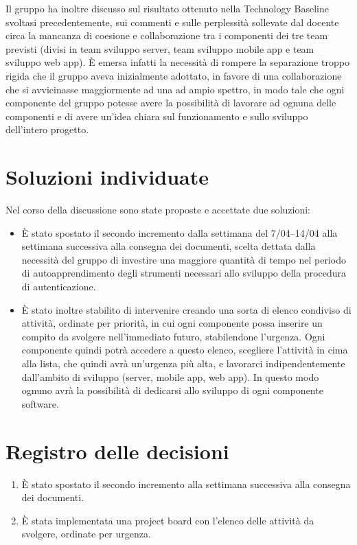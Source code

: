 \documentclass{article}
\begin{document}
Il gruppo ha inoltre discusso sul risultato ottenuto nella Technology Baseline svoltasi precedentemente, sui commenti e sulle perplessità sollevate dal docente circa la mancanza di coesione e collaborazione tra i componenti dei tre team previsti (divisi in team sviluppo server, team sviluppo mobile app e team sviluppo web app).
È emersa infatti la necessità di rompere la separazione troppo rigida che il gruppo aveva inizialmente adottato, in favore di una collaborazione che si avvicinasse maggiormente ad una ad ampio spettro, in modo tale che ogni componente del gruppo potesse avere la possibilità di lavorare ad ognuna delle componenti e di avere un'idea chiara sul funzionamento e sullo sviluppo dell'intero progetto.

\section{Soluzioni individuate}%
\label{sec:soluzioni_individuate}

Nel corso della discussione sono state proposte e accettate due soluzioni:
\begin{itemize}
  \item È stato spostato il secondo incremento dalla settimana del 7/04--14/04 alla settimana successiva alla consegna dei documenti, scelta dettata dalla necessità del gruppo di investire una maggiore quantità di tempo nel periodo di autoapprendimento degli strumenti necessari allo sviluppo della procedura di autenticazione.
  \item È stato inoltre stabilito di intervenire creando una sorta di elenco condiviso di attività, ordinate per priorità, in cui ogni componente possa inserire un compito da svolgere nell'immediato futuro, stabilendone l'urgenza. Ogni componente quindi potrà accedere a questo elenco, scegliere l'attività in cima alla lista, che quindi avrà un'urgenza più alta, e lavorarci indipendentemente dall'ambito di sviluppo (server, mobile app, web app). In questo modo ognuno avrà la possibilità di dedicarsi allo sviluppo di ogni componente software.
\end{itemize}

\newpage
\section{Registro delle decisioni}%
\label{sec:registro_delle_decisioni}

\begin{enumerate}
  \item È stato spostato il secondo incremento alla settimana successiva alla consegna dei documenti.
  \item È stata implementata una project board con l'elenco delle attività da svolgere, ordinate per urgenza.
\end{enumerate}

\end{document}
